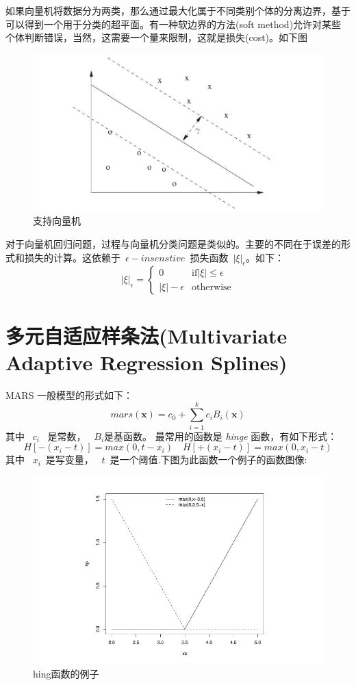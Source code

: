 \documentclass{article}\usepackage[]{graphicx}\usepackage[]{color}
\begin{document}
\begin{CJK*}{UTF8}{gkai}
如果向量机将数据分为两类，那么通过最大化属于不同类别个体的分离边界，基于可以得到一个用于分类的超平面。有一种软边界的方法(soft method)允许对某些个体判断错误，当然，这需要一个量来限制，这就是损失(cost)。如下图
\begin{figure}[ht]
\centering
\includegraphics[width = 12cm]{./svm.jpeg}
\caption{支持向量机}
\end{figure}

对于向量机回归问题，过程与向量机分类问题是类似的。主要的不同在于误差的形式和损失的计算。这依赖于~$\epsilon-insenstive$~损失函数~$|\xi|_\epsilon$。如下：
\begin{equation*}
|\xi|_\epsilon = \left\{\begin{array}{ll}
0 & \text{if} |\xi| \leq \epsilon\\
|\xi|-\epsilon &\text{otherwise}
\end{array}\right.
\end{equation*}
\section{多元自适应样条法(Multivariate Adaptive Regression Splines)}

MARS 一般模型的形式如下：
$$mars(\mathbf{x}) = c_0 + \sum_{i=1}^kc_iB_i(\mathbf{x})$$
其中 ~$c_i$~ 是常数， ~$B_i$是基函数。
最常用的函数是 \textit{hinge} 函数，有如下形式：
$$H[-(x_i - t)] = max(0, t - x_i) \quad H[+(x_i - t)] = max(0, x_i - t)$$
其中 ~$x_i$~是写变量，  ~$t$~是一个阈值.下图为此函数一个例子的函数图像:
\begin{figure}[ht]
\centering
\includegraphics[width = 12cm]{./mar.jpeg}
\caption{hing函数的例子}\label{fig4.1}
\end{figure}

\end{CJK*}
\end{document}
